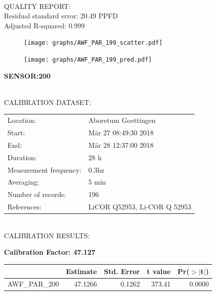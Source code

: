 \documentclass[oneside]{report}
\begin{document}
\hrulefill\\
QUALITY REPORT:\\
Residual standard error: 20.49 PPFD\\
Adjusted R-squared: 0.999



\begin{figure}[H]
  \centering
  \texttt{[image: graphs/AWF\_PAR\_199\_scatter.pdf]}
\end{figure}




\begin{figure}[H]
  \centering
  \texttt{[image: graphs/AWF\_PAR\_199\_pred.pdf]}
\end{figure}

\pagebreak


\begin{center}
\large{\textbf{SENSOR:200}}\\
\end{center}

\hrulefill\\
CALIBRATION DATASET:\\
\begin{table}[h!]
  \centering
  \label{tab:table1}
  \begin{tabular}{ll}
    Location: & Aboretum Goettingen\\ 
    
    
    Start:  & Mär 27 08:49:30 2018 \\
    End:   & Mär 28 12:37:00 2018\\ 
    Duration: & 28 h\\
    Measurement frequency: & 0.3hz\\
    Averaging:  &5 min\\
    Number of records: & 196 \\
    References: & LiCOR Q52953, Li-COR Q 52953 \\
  \end{tabular}
\end{table}

\hrulefill\\
CALIBRATION RESULTS:\\


\begin{center}
\textbf{\large{Calibration Factor: 47.127}}\\
\end{center}
\begin{table}[ht]
\centering
\begin{tabular}{rrrrr}
  \hline
 & Estimate & Std. Error & t value & Pr($>$$|$t$|$) \\ 
  \hline
AWF\_PAR\_200 & 47.1266 & 0.1262 & 373.41 & 0.0000 \\ 
   \hline
\end{tabular}
\end{table}
\end{document}
